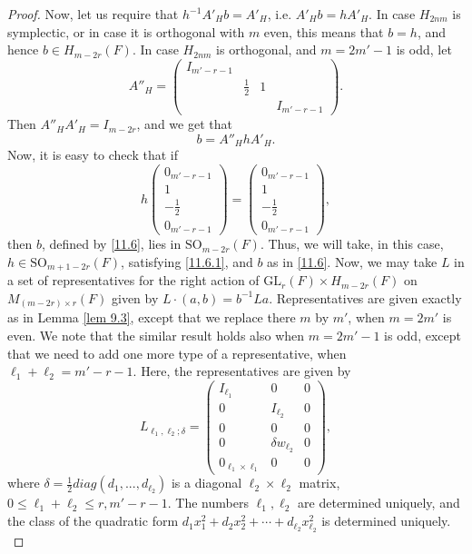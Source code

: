 \documentclass[12pts]{amsart}
\newcommand{\GL}{{\mathrm{GL}}}
\newcommand{\SO}{{\mathrm{SO}}}
\begin{document}
\begin{proof}
 
Now, let us require that $h^{-1}A'_Hb=A'_H$, i.e. $A'_Hb=hA'_H$. In case $H_{2nm}$ is symplectic, or  in case it is orthogonal with $m$ even, this means that $b=h$, and hence $b\in H_{m-2r}(F)$. In case $H_{2nm}$ is orthogonal, and $m=2m'-1$ is odd, let
$$
A''_H=\begin{pmatrix}I_{m'-r-1}\\&\frac{1}{2}&1\\&&&I_{m'-r-1}\end{pmatrix}.
$$
Then $A''_HA'_H=I_{m-2r}$, and we get that 
\begin{equation}\label{11.6}
b=A''_HhA'_H.
\end{equation} 
Now, it is easy to check that if  
\begin{equation}\label{11.6.1}
h\begin{pmatrix}0_{m'-r-1}\\1\\-\frac{1}{2}\\0_{m'-r-1}\end{pmatrix}=\begin{pmatrix}0_{m'-r-1}\\1\\-\frac{1}{2}\\0_{m'-r-1}\end{pmatrix},
\end{equation}
then $b$, defined by \eqref{11.6}, lies in $\SO_{m-2r}(F)$. Thus, we will take, in this case, $h\in \SO_{m+1-2r}(F)$, satisfying \eqref{11.6.1}, and $b$ as in \eqref{11.6}. Now, we may take $L$ in a set of representatives for 
 the right action of $\GL_r(F)\times H_{m-2r}(F)$ on $M_{(m-2r)\times r}(F)$ given by $L\cdot (a,b)=b^{-1}La$. Representatives are given exactly as in Lemma \ref{lem 9.3}, except that we replace there $m$ by $m'$, when $m=2m'$ is even. We note that the similar result holds also when $m=2m'-1$ is odd, except that we need to add one more type of a representative, when $\ell_1+\ell_2=m'-r-1$. Here, the representatives are given by
	$$
	L_{\ell_1,\ell_2;\delta}=\begin{pmatrix}I_{\ell_1}&0&0\\0&I_{\ell_2}&0\\0&0&0\\0&\delta
	w_{\ell_2}&0\\0_{\ell_1\times \ell_1}&0&0\end{pmatrix},
	$$
	where $\delta=\frac{1}{2}diag (d_1,...,d_{\ell_2})$ is a diagonal $\ell_2\times\ell_2$ matrix, $0\leq
	\ell_1+\ell_2\leq r, m'-r-1$. The numbers $\ell_1, \ell_2$ are determined uniquely, and the class of the quadratic form $d_1x_1^2+d_2x_2^2+\cdots+d_{\ell_2}x_{\ell_2}^2$ is determined uniquely. \\

\end{proof}
\end{document}
